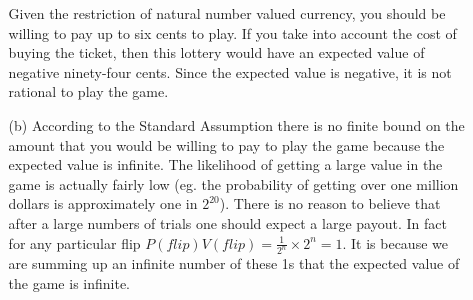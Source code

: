 \documentclass{article}
\begin{document}
\begin{enumerate}
\begin{enumerate}
			Given the restriction of natural number valued currency, you should be willing to pay up to six cents to play. If you take into account the cost of buying the ticket, then this lottery would have an expected value of negative ninety-four cents. Since the expected value is negative, it is not rational to play the game.
\bigskip
	\item[(b)] 
			According to the Standard Assumption there is no finite bound on the amount that you would be willing to pay to play the game because the expected value is infinite. The likelihood of getting a large value in the game is actually fairly low (eg. the probability of getting over one million dollars is approximately one in $2^{20}$). There is no reason to believe that after a large numbers of trials one should expect a large payout. In fact for any particular flip $P(flip)V(flip) = \frac{1}{2^n} \times 2^n = 1$. It is because we are summing up an infinite number of these 1s that the expected value of the game is infinite.
	\end{enumerate}
	
\end{enumerate}
\end{document}
